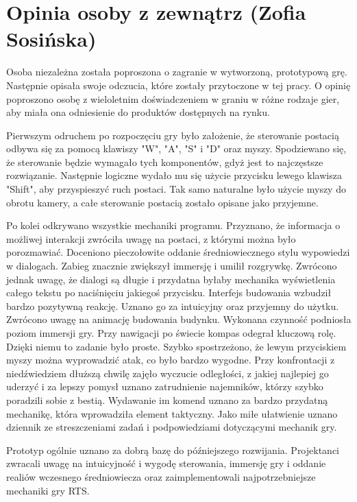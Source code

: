 \section{Opinia osoby z zewnątrz (Zofia Sosińska)}\label{s:opinia}
Osoba niezależna została poproszona o zagranie w wytworzoną, prototypową grę. Następnie opisała swoje odczucia, które zostały przytoczone 
w tej pracy. O opinię poproszono osobę z wieloletnim doświadczeniem w graniu w różne rodzaje gier, aby miała ona odniesienie do produktów
dostępnych na rynku.

Pierwszym odruchem po rozpoczęciu gry było założenie, że sterowanie postacią odbywa się za pomocą klawiszy "W", "A", "S" i "D" oraz myszy. Spodziewano się, 
że sterowanie będzie wymagało tych komponentów, gdyż jest to najczęstsze rozwiązanie. Następnie logiczne wydało mu się użycie przycisku lewego klawisza "Shift", aby przyspieszyć ruch postaci. 
Tak samo naturalne było użycie myszy do obrotu kamery, a całe sterowanie postacią zostało opisane jako przyjemne.

Po kolei odkrywano wszystkie mechaniki programu. Przyznano, że informacja o możliwej interakcji zwróciła uwagę na postaci, z którymi można było porozmawiać. 
Doceniono pieczołowite oddanie średniowiecznego stylu wypowiedzi w dialogach. Zabieg znacznie zwiększył immersję i umilił rozgrywkę. Zwrócono jednak uwagę,
że dialogi są długie i przydatna byłaby mechanika wyświetlenia całego tekstu po naciśnięciu jakiegoś przycisku. Interfejs budowania wzbudził bardzo pozytywną reakcję.
Uznano go za intuicyjny oraz przyjemny do użytku. Zwrócono uwagę na animację budowania budynku. Wykonana czynność podniosła poziom immersji gry. Przy nawigacji po świecie
kompas odegrał kluczową rolę. Dzięki niemu to zadanie było proste. Szybko spostrzeżono, że lewym przyciskiem myszy można wyprowadzić atak, co było bardzo wygodne. 
Przy konfrontacji z niedźwiedziem dłuższą chwilę zajęło wyczucie odległości, z jakiej najlepiej go uderzyć i za lepszy pomysł uznano zatrudnienie najemników, którzy szybko poradzili
sobie z bestią. Wydawanie im komend uznano za bardzo przydatną mechanikę, która wprowadziła element taktyczny. Jako miłe ułatwienie uznano dziennik ze streszczeniami zadań i 
podpowiedziami dotyczącymi mechanik gry.

Prototyp ogólnie uznano za dobrą bazę do późniejszego rozwijania. Projektanci zwracali uwagę na intuicyjność i wygodę sterowania, immersję gry i oddanie realiów wczesnego średniowiecza
oraz zaimplementowali najpotrzebniejsze mechaniki gry RTS. 
